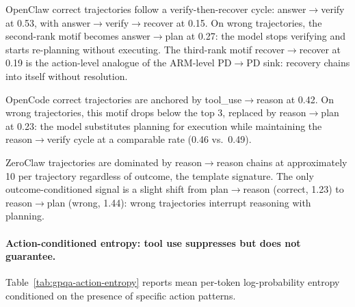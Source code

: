 OpenClaw correct trajectories follow a verify-then-recover cycle:
answer$\to$verify at 0.53, with answer$\to$verify$\to$recover at 0.15.
On wrong trajectories, the second-rank motif becomes answer$\to$plan at 0.27:
the model stops verifying and starts re-planning without executing.
The third-rank motif recover$\to$recover at 0.19 is the action-level analogue
of the ARM-level PD$\to$PD sink: recovery chains into itself without resolution.

OpenCode correct trajectories are anchored by tool\_use$\to$reason at 0.42.
On wrong trajectories, this motif drops below the top 3, replaced by
reason$\to$plan at 0.23: the model substitutes planning for execution while
maintaining the reason$\to$verify cycle at a comparable rate (0.46 vs.\ 0.49).

ZeroClaw trajectories are dominated by reason$\to$reason chains at
approximately 10 per trajectory regardless of outcome, the template signature.
The only outcome-conditioned signal is a slight shift from plan$\to$reason
(correct, 1.23) to reason$\to$plan (wrong, 1.44): wrong trajectories interrupt
reasoning with planning.

\paragraph{Action-conditioned entropy: tool use suppresses but does not
guarantee.}

Table~\ref{tab:gpqa-action-entropy} reports mean per-token log-probability
entropy conditioned on the presence of specific action patterns.

